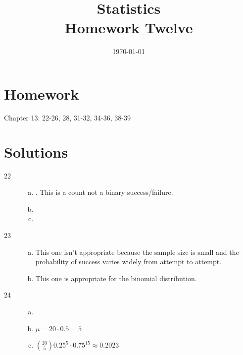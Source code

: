 \documentclass[letterpaper, landscape]{exam}
\title{Statistics \\ Homework Twelve}
\date{\today}
\author{}
\begin{document}
  \maketitle

  \section{Homework}

  Chapter 13: 22-26, 28, 31-32, 34-36, 38-39

  \ifprintanswers
    \section{Solutions}
    \begin{description}

      \item[22] 
        \begin{enumerate}[(a)]
          \item {}. This is a count not a binary
            success/failure.

          \item {}

          \item {}
        \end{enumerate}

      \item[23]
        \begin{enumerate}[(a)]
          \item This one isn't appropriate because the sample size is small and
            the probability of success varies widely from attempt to attempt.

          \item This one is appropriate for the binomial distribution.
        \end{enumerate}

      \item[24]
        \begin{enumerate}[(a)]
          \item {}

          \item $\mu = 20 \cdot 0.5 = \boxed{ 5 }$

          \item $ \binom{20}{5} 0.25^5 \cdot 0.75^{15} \approx \boxed{ 0.2023 } $
        \end{enumerate}


\end{description}
\end{document}
